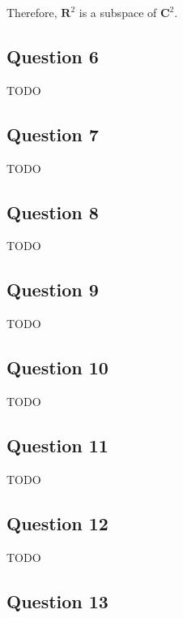 \documentclass[12pt, letterpaper, oneside]{book}
\begin{document}
Therefore, $\mathbf{R}^2$ is a subspace of $\mathbf{C}^2$.

\subsection{Question 6}

TODO

\subsection{Question 7}

TODO

\subsection{Question 8}

TODO

\subsection{Question 9}

TODO

\subsection{Question 10}

TODO

\subsection{Question 11}

TODO

\subsection{Question 12}

TODO

\subsection{Question 13}
\end{document}
